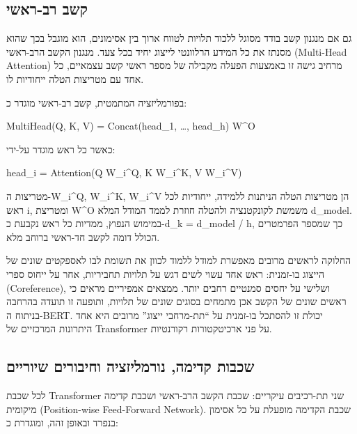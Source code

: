 \hypertarget{ux5e7ux5e9ux5d1-ux5e8ux5d1-ux5e8ux5d0ux5e9ux5d9}{%
\subsection{קשב
רב-ראשי}\label{ux5e7ux5e9ux5d1-ux5e8ux5d1-ux5e8ux5d0ux5e9ux5d9}}

גם אם מנגנון קשב בודד מסוגל ללכוד תלויות לטווח ארוך בין אסימונים, הוא
מוגבל בכך שהוא מסנתז את כל המידע הרלוונטי לייצוג יחיד בכל צעד. מנגנון
הקשב הרב-ראשי (Multi-Head Attention) מרחיב גישה זו באמצעות הפעלה מקבילה
של מספר ראשי קשב עצמאיים, כל אחד עם מטריצות הטלה ייחודיות לו.

בפורמליזציה המתמטית, קשב רב-ראשי מוגדר כ:

MultiHead(Q, K, V) = Concat(head\_1, \ldots, head\_h) W\^{}O

כאשר כל ראש מוגדר על-ידי:

head\_i = Attention(Q W\_i\^{}Q, K W\_i\^{}K, V W\_i\^{}V)

מטריצות ה-W\_i\^{}Q, W\_i\^{}K, W\_i\^{}V הן מטריצות הטלה הניתנות
ללמידה, ייחודיות לכל ראש i, ומטריצת W\^{}O משמשת לקונקטנציה ולהטלה חוזרת
לממד המודל המלא d\_model. במימוש הנפוץ, ממדיות כל ראש נקבעת כ-d\_k =
d\_model / h, כך שמספר הפרמטרים הכולל דומה לקשב חד-ראשי ברוחב מלא.

החלוקה לראשים מרובים מאפשרת למודל ללמוד לכוון את תשומת לבו לאספקטים
שונים של הייצוג בו-זמנית: ראש אחד עשוי לשים דגש על תלויות תחביריות, אחר
על ייחוס ספרי (Coreference), ושלישי על יחסים סמנטיים רחבים יותר. ממצאים
אמפיריים מראים כי ראשים שונים של הקשב אכן מתמחים בסוגים שונים של תלויות,
ותופעה זו תועדה בהרחבה בניתוח ה-BERT. יכולת זו להסתכל בו-זמנית על
``תת-מרחבי ייצוג'' מרובים היא אחד היתרונות המרכזיים של Transformer על
פני ארכיטקטורות רקורנטיות.

\hypertarget{ux5e9ux5dbux5d1ux5d5ux5ea-ux5e7ux5d3ux5d9ux5deux5d4-ux5e0ux5d5ux5e8ux5deux5dcux5d9ux5d6ux5e6ux5d9ux5d4-ux5d5ux5d7ux5d9ux5d1ux5d5ux5e8ux5d9ux5dd-ux5e9ux5d9ux5d5ux5e8ux5d9ux5d9ux5dd}{%
\subsection{שכבות קדימה, נורמליזציה וחיבורים
שיוריים}\label{ux5e9ux5dbux5d1ux5d5ux5ea-ux5e7ux5d3ux5d9ux5deux5d4-ux5e0ux5d5ux5e8ux5deux5dcux5d9ux5d6ux5e6ux5d9ux5d4-ux5d5ux5d7ux5d9ux5d1ux5d5ux5e8ux5d9ux5dd-ux5e9ux5d9ux5d5ux5e8ux5d9ux5d9ux5dd}}

לכל שכבת Transformer שני תת-רכיבים עיקריים: שכבת הקשב הרב-ראשי ושכבת
קדימה מיקומית (Position-wise Feed-Forward Network). שכבת הקדימה מופעלת
על כל אסימון בנפרד ובאופן זהה, ומוגדרת כ:


